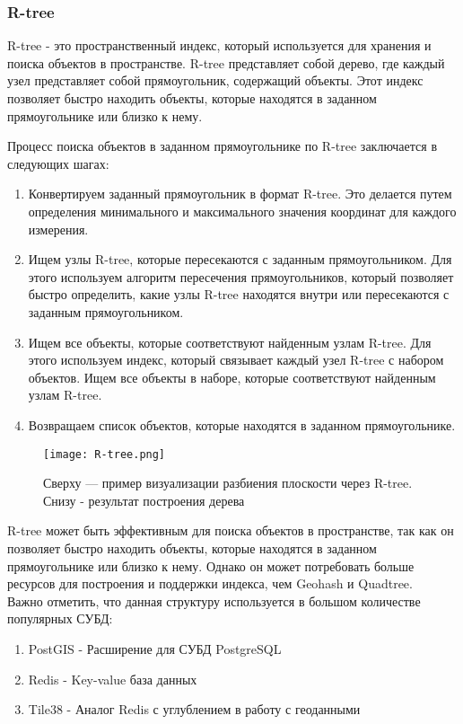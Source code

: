 \subsubsection{R-tree}
R-tree - это пространственный индекс, который используется для хранения и поиска объектов в пространстве. R-tree представляет собой дерево, где каждый узел представляет собой прямоугольник, содержащий объекты. Этот индекс позволяет быстро находить объекты, которые находятся в заданном прямоугольнике или близко к нему.

Процесс поиска объектов в заданном прямоугольнике по R-tree заключается в следующих шагах:

\begin{enumerate}
    \item Конвертируем заданный прямоугольник в формат R-tree. Это делается путем определения минимального и максимального значения координат для каждого измерения.
    \item Ищем узлы R-tree, которые пересекаются с заданным прямоугольником. Для этого используем алгоритм пересечения прямоугольников, который позволяет быстро определить, какие узлы R-tree находятся внутри или пересекаются с заданным прямоугольником.
    \item Ищем все объекты, которые соответствуют найденным узлам R-tree. Для этого используем индекс, который связывает каждый узел R-tree с набором объектов. Ищем все объекты в наборе, которые соответствуют найденным узлам R-tree.
    \item Возвращаем список объектов, которые находятся в заданном прямоугольнике.
\end{enumerate}

\begin{figure}[h]
    \centering
    \texttt{[image: R-tree.png]}
    \caption{Сверху — пример визуализации разбиения плоскости через R-tree. Снизу - результат построения дерева}
\end{figure}

R-tree может быть эффективным для поиска объектов в пространстве, так как он позволяет быстро находить объекты, которые находятся в заданном прямоугольнике или близко к нему. Однако он может потребовать больше ресурсов для построения и поддержки индекса, чем Geohash и Quadtree. \\
Важно отметить, что данная структуру используется в большом количестве популярных СУБД:
\begin{enumerate}
    \item PostGIS - Расширение для СУБД PostgreSQL
    \item Redis - Key-value база данных
    \item Tile38 - Аналог Redis с углублением в работу с геоданными
\end{enumerate}

